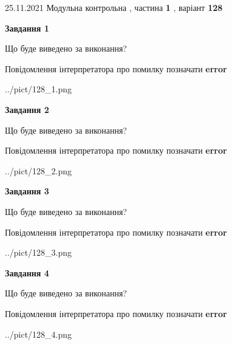 \documentclass[10pt, ukrainian]{article}
\begin{document}
{25.11.2021 Модульна контрольна , частина \textbf { 1 }, варіант  \No \textbf { 128 }\par}
{
\begin {large}

{\begin {center}\textbf{Завдання 1}\end {center}}\par
Що буде виведено за виконання? \par
Повідомлення інтерпретатора про помилку позначати \textbf{error}

\begin{center}
	{../pict/128_1.png}
\end{center}
\newpage

{\begin {center}\textbf{Завдання 2}\end {center}}\par
Що буде виведено за виконання? \par
Повідомлення інтерпретатора про помилку позначати \textbf{error}

\begin{center}
	{../pict/128_2.png}
\end{center}
\newpage

{\begin {center}\textbf{Завдання 3}\end {center}}\par
Що буде виведено за виконання? \par
Повідомлення інтерпретатора про помилку позначати \textbf{error}

\begin{center}
	{../pict/128_3.png}
\end{center}
\newpage

{\begin {center}\textbf{Завдання 4}\end {center}}\par
Що буде виведено за виконання? \par
Повідомлення інтерпретатора про помилку позначати \textbf{error}

\begin{center}
	{../pict/128_4.png}
\end{center}
\newpage


\end{large}}
\end{document}
